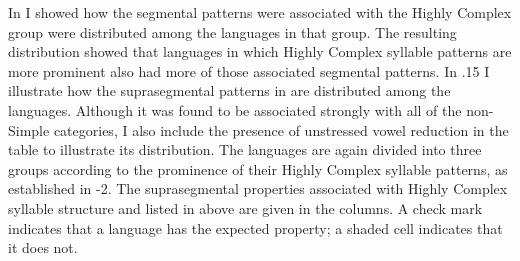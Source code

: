   In  I showed how the segmental patterns were associated with the Highly Complex group were distributed among the languages in that group. The resulting distribution showed that languages in which Highly Complex syllable patterns are more prominent also had more of those associated segmental patterns. In .15 I illustrate how the suprasegmental patterns in  are distributed among the languages. Although it was found to be associated strongly with all of the non-Simple categories, I also include the presence of unstressed vowel reduction in the table to illustrate its distribution. The languages are again divided into three groups according to the prominence of their Highly Complex syllable patterns, as established in -2. The suprasegmental properties associated with Highly Complex syllable structure and listed in  above are given in the columns. A check mark indicates that a language has the expected property; a shaded cell indicates that it does not. 

